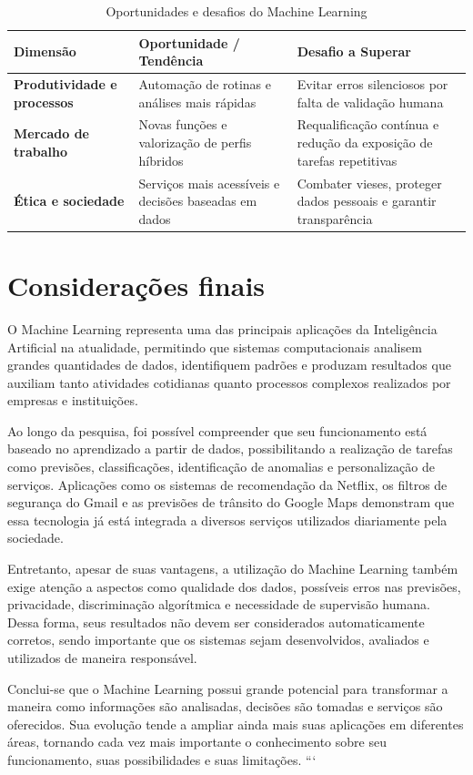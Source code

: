 \begin{table}[htb]
	\centering
	\caption{Oportunidades e desafios do Machine Learning}
	\label{tab:oportunidades_desafios_ml}
	\begin{tabular}{|p{3.2cm}|p{4.2cm}|p{4.2cm}|}
		\hline
		\textbf{Dimensão} & \textbf{Oportunidade / Tendência} & \textbf{Desafio a Superar} \\ \hline
		
		\textbf{Produtividade e processos} & 
		Automação de rotinas e análises mais rápidas & 
		Evitar erros silenciosos por falta de validação humana \\ \hline
		
		\textbf{Mercado de trabalho} & 
		Novas funções e valorização de perfis híbridos & 
		Requalificação contínua e redução da exposição de tarefas repetitivas \\ \hline
		
		\textbf{Ética e sociedade} & 
		Serviços mais acessíveis e decisões baseadas em dados & 
		Combater vieses, proteger dados pessoais e garantir transparência \\ \hline
	\end{tabular}
\end{table}

\chapter{Considerações finais}

O Machine Learning representa uma das principais aplicações da Inteligência Artificial na atualidade, permitindo que sistemas computacionais analisem grandes quantidades de dados, identifiquem padrões e produzam resultados que auxiliam tanto atividades cotidianas quanto processos complexos realizados por empresas e instituições.

Ao longo da pesquisa, foi possível compreender que seu funcionamento está baseado no aprendizado a partir de dados, possibilitando a realização de tarefas como previsões, classificações, identificação de anomalias e personalização de serviços. Aplicações como os sistemas de recomendação da Netflix, os filtros de segurança do Gmail e as previsões de trânsito do Google Maps demonstram que essa tecnologia já está integrada a diversos serviços utilizados diariamente pela sociedade.

Entretanto, apesar de suas vantagens, a utilização do Machine Learning também exige atenção a aspectos como qualidade dos dados, possíveis erros nas previsões, privacidade, discriminação algorítmica e necessidade de supervisão humana. Dessa forma, seus resultados não devem ser considerados automaticamente corretos, sendo importante que os sistemas sejam desenvolvidos, avaliados e utilizados de maneira responsável.

Conclui-se que o Machine Learning possui grande potencial para transformar a maneira como informações são analisadas, decisões são tomadas e serviços são oferecidos. Sua evolução tende a ampliar ainda mais suas aplicações em diferentes áreas, tornando cada vez mais importante o conhecimento sobre seu funcionamento, suas possibilidades e suas limitações.
```